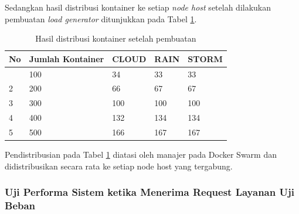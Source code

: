 				Sedangkan hasil distribusi kontainer ke setiap \textit{node host} setelah dilakukan pembuatan \textit{load generator} ditunjukkan pada Tabel \ref{jumlahkontainerpem}.
				\begin{longtable}{|p{}|p{}|p{0.15\textwidth}|p{}|p{}|}
					\caption{Hasil distribusi kontainer setelah pembuatan} \label{jumlahkontainerpem} \\
					\hline
					\textbf{No} & \textbf{Jumlah Kontainer} & \textbf{CLOUD} & \textbf{RAIN} & \textbf{STORM} \\ \hline
					\endhead
					\endfoot
					\endlastfoot
					1 & 100 & 34 & 33 & 33 \\ \hline
					2 & 200 & 66 & 67 & 67 \\ \hline
					3 & 300 & 100 & 100 & 100 \\ \hline
					4 & 400 & 132 & 134 & 134 \\ \hline
					5 & 500 & 166 & 167 & 167 \\ \hline
				\end{longtable}
			
				Pendistribusian pada Tabel \ref{jumlahkontainerpem} diatasi oleh manajer pada Docker Swarm dan didistribusikan secara rata ke setiap node host yang tergabung.
			
			\subsubsection{Uji Performa Sistem ketika Menerima Request Layanan Uji Beban}
				
